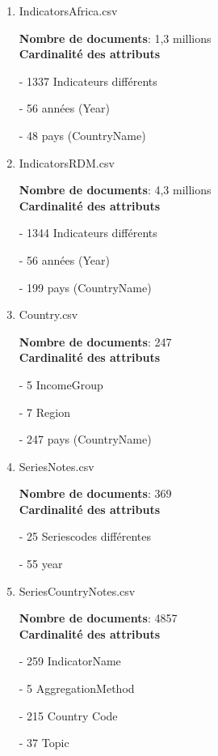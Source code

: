 \begin{enumerate}
    \item IndicatorsAfrica.csv
\vspace{2mm}

\textbf{Nombre de documents}: 1,3 millions \\
\textbf{Cardinalité des attributs}

     - 1337 Indicateurs différents 
     
     - 56 années (Year)
     
     - 48 pays (CountryName)

     \item IndicatorsRDM.csv
\vspace{2mm}

\textbf{Nombre de documents}: 4,3 millions \\
\textbf{Cardinalité des attributs}

     - 1344 Indicateurs différents 
     
     - 56 années (Year)
     
     - 199 pays (CountryName)


\vspace{2mm}

    \item Country.csv
\vspace{2mm}

\textbf{Nombre de documents}: 247 \\
\textbf{Cardinalité des attributs}

     - 5 IncomeGroup
     
     - 7 Region
     
     - 247 pays (CountryName)

\vspace{2mm}
    \item SeriesNotes.csv
\vspace{2mm}

\textbf{Nombre de documents}: 369 \\
\textbf{Cardinalité des attributs}

     - 25 Seriescodes différentes
     
     - 55 year


\vspace{2mm}
    \item SeriesCountryNotes.csv
\vspace{2mm}

\textbf{Nombre de documents}: 4857 \\
\textbf{Cardinalité des attributs}

     - 259 IndicatorName

     - 5 AggregationMethod

     - 215 Country Code

     - 37 Topic

\end{enumerate}




